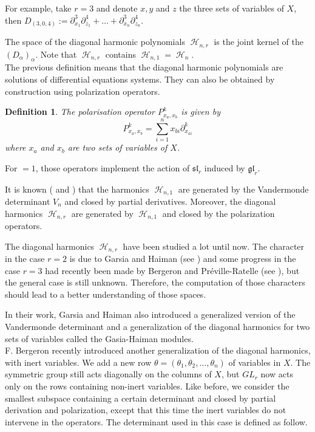 \documentclass[letter,12pt]{article}
\newcommand{\pauline}[1]{\todo[linecolor=blue,backgroundcolor=blue!25,bordercolor=blue]{#1}}
\DeclareMathOperator{\harmonics}{\mathcal{H}}
\newtheorem{definition}{Definition}
\begin{document}
	For example, take $r=3$ and denote $x, y$ and $z$ the three sets of variables of $X$, then $D_{(3,0,4)} := \partial_{x_1}^3\partial_{z_1}^4 + \dots + \partial_{x_n}^3\partial_{z_n}^4$. 
	
	The space of the diagonal harmonic polynomials $\harmonics_{n,r}$ is the joint kernel of the $(D_\alpha)_\alpha$. Note that $\harmonics_{n,r}$ contains $\harmonics_{n,1} = \harmonics_{n}$.\\
	
	The previous definition means that the diagonal harmonic polynomials are solutions of differential equations systems. 
	They can also be obtained by construction using polarization operators. 
	
	\begin{definition} \pauline{define polarization now or later ?}
		The \emph{polarisation operator} $P_{x_a,x_b}^k$ is given by
		$$P_{x_a,x_b}^k = \sum_{i=1}^{n} x_{bi} \partial_{x_{ai}}^k$$
		where $x_a$ and $x_b$ are two sets of variables of $X$. 
	\end{definition}
	
	For $=1$, those operators implement the action of $\mathfrak{sl}_r$ induced by $\mathfrak{gl}_r$.
	
	It is known (\cite{Haiman2002} and \cite{Bergeron2009}) that the harmonics $\harmonics_{n,1}$ are generated by the Vandermonde determinant $V_n$ and closed by partial derivatives. Moreover, the diagonal harmonics $\harmonics_{n,r}$ are generated by $\harmonics_{n,1}$ and closed by the polarization operators.
	
	The diagonal harmonics $\harmonics_{n,r}$ have been studied a lot until now. The character in the case $r=2$ is due to Garsia and Haiman (see \cite{GarsiaHaiman1993}) and some progress in the case $r=3$ had recently been made by Bergeron and Préville-Ratelle (see \cite{BergeronPreville2012}), but the general case is still unknown. Therefore, the computation of those characters should lead to a better understanding of those spaces. 
	
	In their work, Garsia and Haiman also introduced a generalized version of the Vandermonde determinant and a generalization of the diagonal harmonics for two sets of variables called the Gasia-Haiman modules. \\
	
	F. Bergeron recently introduced another generalization of the diagonal harmonics, with inert variables. We add a new row $\theta = (\theta_1, \theta_2, \dots, \theta_n)$ of variables in $X$. The symmetric group still acts diagonally on the columns of $X$, but $GL_r$ now acts only on the rows containing non-inert variables. Like before, we consider the smallest subspace containing a certain determinant and closed by partial derivation and polarization, except that this time the inert variables do not intervene in the operators. The determinant used in this case is defined as follow.   
	 
\end{document}
